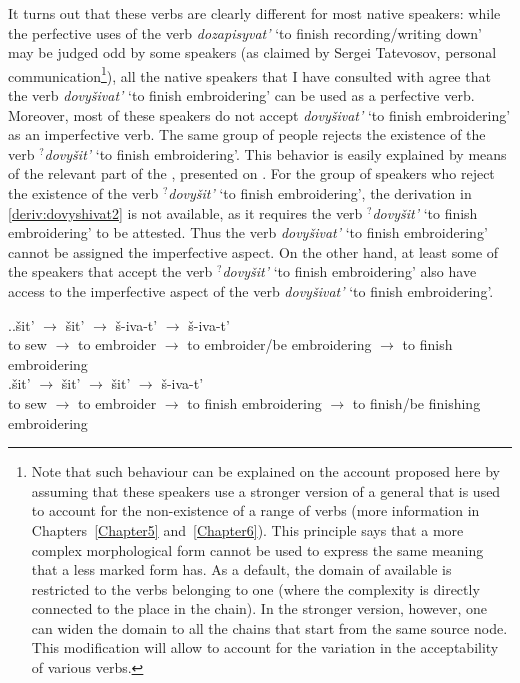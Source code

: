 It turns out that these verbs are clearly different for most native speakers: while the perfective uses of the verb \textit{dozapisyvat'} `to finish recording/writing down' may be judged odd by some speakers (as claimed by Sergei Tatevosov, personal communication\footnote{Note that such behaviour can be explained on the account proposed here by assuming that these speakers use a stronger version of a general  that is used to account for the non-existence of a range of verbs (more information in Chapters~\ref{Chapter5} and~\ref{Chapter6}). This principle says that a more complex morphological form cannot be used to express the same meaning that a less marked form has. As a default, the domain of available  is restricted to the verbs belonging to one  (where the complexity is directly connected to the place in the chain). In the stronger version, however, one can widen the domain to all the chains that start from the same source node. This modification will allow to account for the variation in the acceptability of various verbs.}), all the native speakers that I have consulted with agree that the verb \textit{dovy\v{s}ivat'} `to finish embroidering' can be used as a perfective verb. Moreover, most of these speakers do not accept \textit{dovy\v{s}ivat'} `to finish embroidering' as an imperfective verb. The same group of people rejects the existence of the verb $^?$\textit{dovy\v{s}it'}\textsuperscript{\PF} `to finish embroidering'. This behavior is easily explained by means of the relevant part of the , presented on . For the group of speakers who reject the existence of the verb $^?$\textit{dovy\v{s}it'}\textsuperscript{\PF} `to finish embroidering', the derivation in \ref{deriv:dovyshivat2} is not available, as it requires the verb $^?$\textit{dovy\v{s}it'}\textsuperscript{\PF} `to finish embroidering' to be attested. Thus the verb \textit{dovy\v{s}ivat'} `to finish embroidering' cannot be assigned the imperfective aspect. On the other hand, at least some of the speakers that accept the verb $^?$\textit{dovy\v{s}it'}\textsuperscript{\PF} `to finish embroidering' also have access to the imperfective aspect of the verb \textit{dovy\v{s}ivat'} `to finish embroidering'.

\ex.\label{deriv:dovyshivat}\ag.\label{deriv:dovyshivat1}\v{s}it'\textsuperscript{\IPF} $\rightarrow$ \v{s}it'\textsuperscript{\PF} $\rightarrow$ \v{s}-iva-t'\textsuperscript{\IPF} $\rightarrow$ \v{s}-iva-t'\textsuperscript{\PF}\\
{to sew} $\rightarrow$ {to embroider} $\rightarrow$ {to embroider/be embroidering} $\rightarrow$ {to finish embroidering}\\
\bg.\label{deriv:dovyshivat2}\v{s}it'\textsuperscript{\IPF} $\rightarrow$ \v{s}it'\textsuperscript{\PF} $\rightarrow$ \v{s}it'\textsuperscript{\PF} $\rightarrow$ \v{s}-iva-t'\textsuperscript{\IPF}\\
{to sew} $\rightarrow$ {to embroider} $\rightarrow$ {to finish embroidering} $\rightarrow$ {to finish/be finishing embroidering}\\

